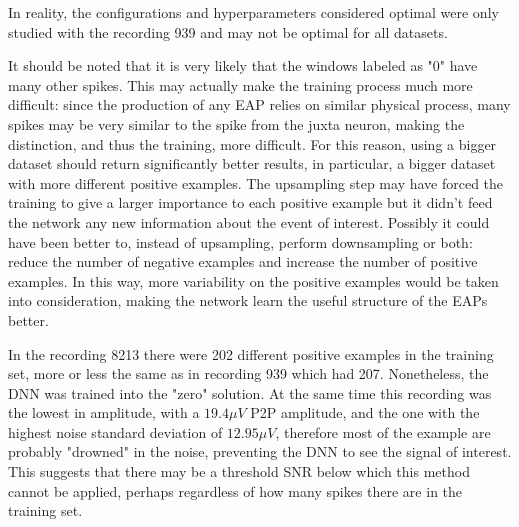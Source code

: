 In reality, the configurations and hyperparameters considered optimal were only studied with the recording 939 and may not be optimal for all datasets.

It should be noted that it is very likely that the windows labeled as "0" have many other spikes. This may actually make the training process much more difficult: since the production of any EAP relies on similar physical process, many spikes may be very similar to the spike from the juxta neuron, making the distinction, and thus the training, more difficult. For this reason, using a bigger dataset should return significantly better results, in particular, a bigger dataset with more different positive examples. The upsampling step may have forced the training to give a larger importance to each positive example but it didn't feed the network any new information about the event of interest. Possibly it could have been better to, instead of upsampling, perform downsampling or both: reduce the number of negative examples and increase the number of positive examples. In this way, more variability on the positive examples would be taken into consideration, making the network learn the useful structure of the EAPs better.

In the recording 8213 there were 202 different positive examples in the training set, more or less the same as in recording 939 which had 207. Nonetheless, the DNN was trained into the "zero" solution. At the same time this recording was the lowest in amplitude, with a $19.4 \mu V$ P2P amplitude, and the one with the highest noise standard deviation of $12.95 \mu V$, therefore most of the example are probably "drowned" in the noise, preventing the DNN to see the signal of interest. This suggests that there may be a threshold SNR below which this method cannot be applied, perhaps regardless of how many spikes there are in the training set.

